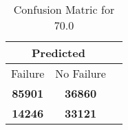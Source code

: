 \begin{table}[] 
\label{Table: Prediction Accuracy-DMD70.0OnlySunEKF-combinationReflection-Reflection} 
\caption{Confusion Matric for 70.0} 
\centering 
\begin{tabular} 
 {@{}ccc@{}} 
\toprule 
\multicolumn{2}{c}{\textbf{Predicted}}
 \\ \midrule 
\multicolumn{1}{|c|}{Failure} & 
\multicolumn{1}{c|}{No Failure}
 \\ \midrule 
\multicolumn{1}{|c|}{\color{green}\textbf{85901}} & 
\multicolumn{1}{c|}{\color{green}\textbf{36860}}
 \\ \midrule 
\multicolumn{1}{|c|}{\color{red}\textbf{14246}} & 
\multicolumn{1}{c|}{\color{red}\textbf{33121}}
 \\ \bottomrule 
\end{tabular} 
\end{table} 
